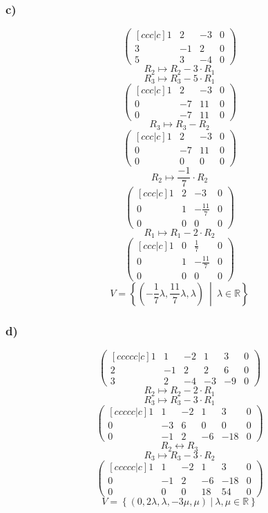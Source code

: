 \documentclass[lineaire_algebra_oplossingen.tex]{subfiles}
\begin{document}
\subsubsection*{c)}
\[
\begin{pmatrix}[ccc|c]
1 &  2 &  -3 & 0\\
3 &  -1 &  2 & 0\\
5 &  3 &  -4 & 0
\end{pmatrix}
\]
\[ R_2 \longmapsto R_2 -3\cdot R_1\]
\[ R_3 \longmapsto R_3 -5\cdot R_1\]
\[
\begin{pmatrix}[ccc|c]
1 &   2 &  -3 & 0\\
0 &  -7 &  11 & 0\\
0 &  -7 &  11 & 0
\end{pmatrix}
\]
\[ R_3 \longmapsto R_3 - R_2\]
\[
\begin{pmatrix}[ccc|c]
1 &  2 &  -3 & 0\\
0 & -7 &  11 & 0\\
0 &  0 &  0  & 0
\end{pmatrix}
\]
\[ R_2 \longmapsto \frac{-1}{7}\cdot R_2\]
\[
\begin{pmatrix}[ccc|c]
1 &  2 &  -3 & 0\\
0 & 1 &  -\frac{11}{7} & 0\\
0 &  0 &  0  & 0
\end{pmatrix}
\]
\[ R_1 \longmapsto R_1 -2\cdot R_2\]
\[
\begin{pmatrix}[ccc|c]
1 &  0 &  \frac{1}{7} & 0\\
0 & 1 &  -\frac{11}{7} & 0\\
0 &  0 &  0  & 0
\end{pmatrix}
\]
\[
V = \left\{\left( -\frac{1}{7}\lambda,\frac{11}{7}\lambda,\lambda \right)\ \middle|\  \lambda\in\mathbb{R} \right\}
\]
\subsubsection*{d)}
\[
\begin{pmatrix}[ccccc|c]
1 &  1 &  -2 & 1 & 3 & 0\\
2 &  -1 &  2 & 2 & 6 & 0\\
3 &  2 &  -4 & -3 & -9 & 0
\end{pmatrix}
\]
\[ R_2 \longmapsto R_2 -2\cdot R_1\]
\[ R_3 \longmapsto R_3 -3\cdot R_1\]
\[
\begin{pmatrix}[ccccc|c]
1 &  1 &  -2 & 1 & 3 & 0\\
0 &  -3 &  6 & 0 & 0 & 0\\
0 &  -1 &  2 & -6 & -18 & 0
\end{pmatrix}
\]
\[ R_2 \leftrightarrow R_3\]
\[ R_3 \longmapsto R_3 -3\cdot R_2\]
\[
\begin{pmatrix}[ccccc|c]
1 &  1 &  -2 & 1 & 3 & 0\\
0 &  -1 &  2 & -6 & -18 & 0\\
0 &  0 &  0 & 18 & 54 & 0
\end{pmatrix}
\]
\[
V = 
\left\{ 
\left( 0,2\lambda,\lambda,-3\mu,\mu  \right)
\ |\ \lambda,\mu\in\mathbb{R}
\right\}
\]
\end{document}

